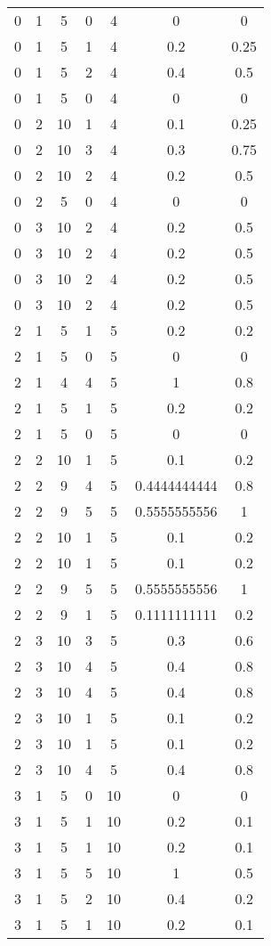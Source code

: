 \begin{longtable}[c]{| c | c | c | c | c | c | c |}
0	&	1	&	5	&	0	&	4	&	0	&	0	\\
0	&	1	&	5	&	1	&	4	&	0.2	&	0.25	\\
0	&	1	&	5	&	2	&	4	&	0.4	&	0.5	\\
0	&	1	&	5	&	0	&	4	&	0	&	0	\\
0	&	2	&	10	&	1	&	4	&	0.1	&	0.25	\\
0	&	2	&	10	&	3	&	4	&	0.3	&	0.75	\\
0	&	2	&	10	&	2	&	4	&	0.2	&	0.5	\\
0	&	2	&	5	&	0	&	4	&	0	&	0	\\
0	&	3	&	10	&	2	&	4	&	0.2	&	0.5	\\
0	&	3	&	10	&	2	&	4	&	0.2	&	0.5	\\
0	&	3	&	10	&	2	&	4	&	0.2	&	0.5	\\
0	&	3	&	10	&	2	&	4	&	0.2	&	0.5	\\
2	&	1	&	5	&	1	&	5	&	0.2	&	0.2	\\
2	&	1	&	5	&	0	&	5	&	0	&	0	\\
2	&	1	&	4	&	4	&	5	&	1	&	0.8	\\
2	&	1	&	5	&	1	&	5	&	0.2	&	0.2	\\
2	&	1	&	5	&	0	&	5	&	0	&	0	\\
2	&	2	&	10	&	1	&	5	&	0.1	&	0.2	\\
2	&	2	&	9	&	4	&	5	&	0.4444444444	&	0.8	\\
2	&	2	&	9	&	5	&	5	&	0.5555555556	&	1	\\
2	&	2	&	10	&	1	&	5	&	0.1	&	0.2	\\
2	&	2	&	10	&	1	&	5	&	0.1	&	0.2	\\
2	&	2	&	9	&	5	&	5	&	0.5555555556	&	1	\\
2	&	2	&	9	&	1	&	5	&	0.1111111111	&	0.2	\\
2	&	3	&	10	&	3	&	5	&	0.3	&	0.6	\\
2	&	3	&	10	&	4	&	5	&	0.4	&	0.8	\\
2	&	3	&	10	&	4	&	5	&	0.4	&	0.8	\\
2	&	3	&	10	&	1	&	5	&	0.1	&	0.2	\\
2	&	3	&	10	&	1	&	5	&	0.1	&	0.2	\\
2	&	3	&	10	&	4	&	5	&	0.4	&	0.8	\\
3	&	1	&	5	&	0	&	10	&	0	&	0	\\
3	&	1	&	5	&	1	&	10	&	0.2	&	0.1	\\
3	&	1	&	5	&	1	&	10	&	0.2	&	0.1	\\
3	&	1	&	5	&	5	&	10	&	1	&	0.5	\\
3	&	1	&	5	&	2	&	10	&	0.4	&	0.2	\\
3	&	1	&	5	&	1	&	10	&	0.2	&	0.1	\\

\end{longtable}
